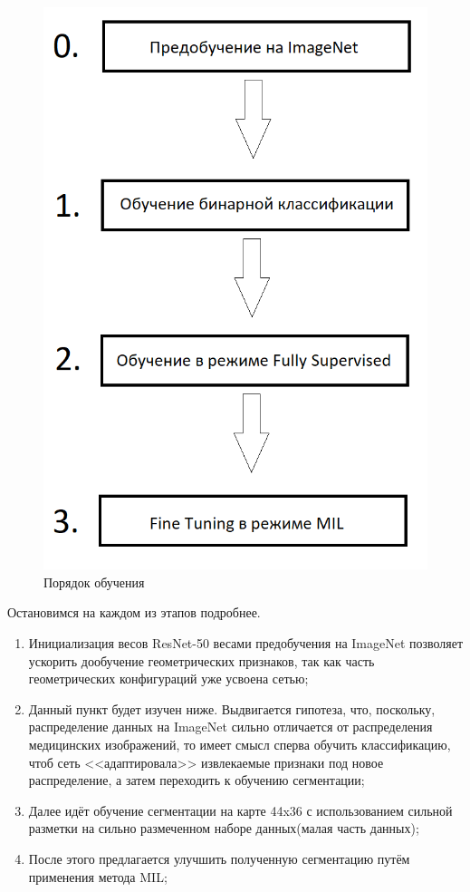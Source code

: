 \begin{figure}[h] 
  \center
  \includegraphics [scale=0.4] {images/schema.png}
  \caption{Порядок обучения} 
  \label{fig:schema_order}  
\end{figure}

Остановимся на каждом из этапов подробнее.

\begin{enumerate}[start=0]
    \item Инициализация весов ResNet-50 весами предобучения на ImageNet позволяет ускорить дообучение геометрических признаков, так как часть геометрических конфигураций уже усвоена сетью;
    \item Данный пункт будет изучен ниже. Выдвигается гипотеза, что, поскольку, распределение данных на ImageNet сильно отличается от распределения медицинских изображений, то имеет смысл сперва обучить классификацию, чтоб сеть <<адаптировала>> извлекаемые признаки под новое распределение, а затем переходить к обучению сегментации;  
    \item Далее идёт обучение сегментации на карте 44x36 с использованием сильной разметки на сильно размеченном наборе данных(малая часть данных);
    \item После этого предлагается улучшить полученную сегментацию путём применения метода MIL;
\end{enumerate}

